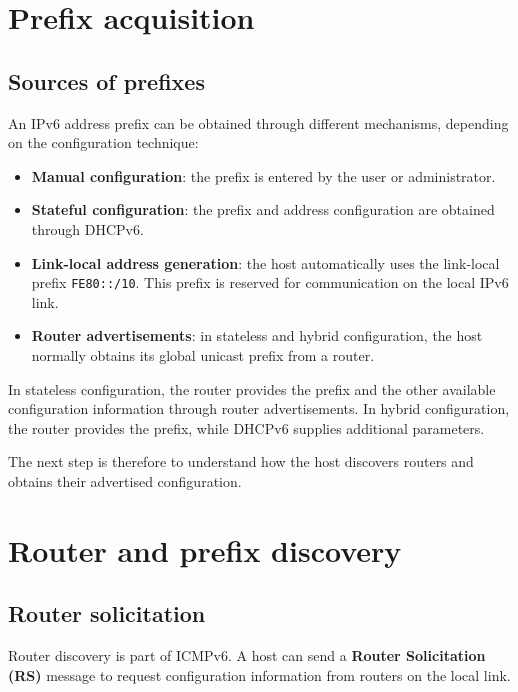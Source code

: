 \section{Prefix acquisition}

\subsection{Sources of prefixes}
An IPv6 address prefix can be obtained through different mechanisms,
depending on the configuration technique:

\begin{itemize}
	\item \textbf{Manual configuration}: the prefix is entered by the
	user or administrator.
	\item \textbf{Stateful configuration}: the prefix and address
	configuration are obtained through DHCPv6.
	\item \textbf{Link-local address generation}: the host automatically
	uses the link-local prefix \texttt{FE80::/10}. This prefix is
	reserved for communication on the local IPv6 link.
	\item \textbf{Router advertisements}: in stateless and hybrid
	configuration, the host normally obtains its global unicast prefix
	from a router.
\end{itemize}

In stateless configuration, the router provides the prefix and the
other available configuration information through router
advertisements. In hybrid configuration, the router provides the
prefix, while DHCPv6 supplies additional parameters.

The next step is therefore to understand how the host discovers
routers and obtains their advertised configuration.

\section{Router and prefix discovery}

\begin{center}
\end{center}

\subsection{Router solicitation}
Router discovery is part of ICMPv6. A host can send a
\textbf{Router Solicitation (RS)} message to request configuration
information from routers on the local link.

